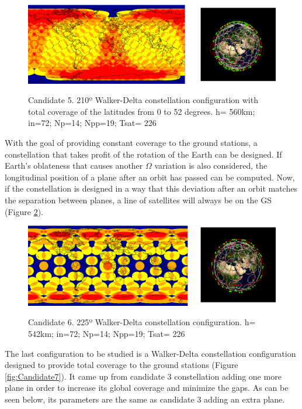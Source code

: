\begin{figure}[H]%
	\centering
	\includegraphics[width=1\textwidth]{Candidate5.png}\\
	\caption[Candidate 5]{Candidate 5. 210º Walker-Delta constellation configuration with total coverage of the latitudes from 0 to 52 degrees.
			 h= 560km; in=72; Np=14; Npp=19; Tsat= 226} 
	\label{fig:Candidate5}
\end{figure}


With the goal of providing constant coverage to the ground stations, a constellation that takes profit of the rotation of the Earth can be designed. If Earth's oblateness that causes another $\Omega$ variation  is also considered, the longitudinal position of a plane after an orbit has passed can be computed. Now, if the constellation is designed in a way that this deviation after an orbit matches the separation between planes, a line of satellites will always be on the GS (Figure \ref{fig:Candidate6}).

\begin{figure}[H]%
	\centering
	\includegraphics[width=1\textwidth]{Candidate6.png}\\
	\caption[Candidate 6]{Candidate 6. 225º Walker-Delta constellation configuration. h= 542km; in=72; Np=14; Npp=19; Tsat= 226}
	\label{fig:Candidate6}
\end{figure}


The last configuration to be studied is a Walker-Delta constellation configuration designed to provide total coverage to the ground stations (Figure \ref{fig:Candidate7}). It came up from candidate 3 constellation adding one more plane in order to increase its global coverage and minimize the gaps. As can be seen below, its parameters are the same as candidate 3 adding an extra plane.

